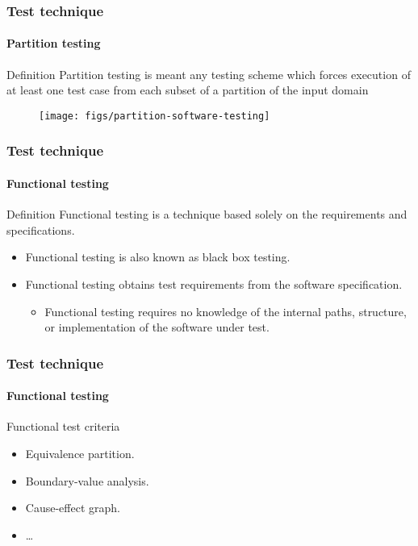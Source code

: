 \begin{frame}
\frametitle{Test technique}
\framesubtitle{Partition testing}
\label{concept:partition-testing}

\begin{block:concept}{Definition}
Partition testing is meant any testing scheme which forces execution
of at least one test case from each subset of a partition of the input
domain
\end{block:concept}

\begin{figure}
    \centering
    \texttt{[image: figs/partition-software-testing]}
\end{figure}
\end{frame}



\begin{frame}
\frametitle{Test technique}
\framesubtitle{Functional testing}
\label{concept:functional-testing}

\begin{block:concept}{Definition}
Functional testing is a technique based solely on the requirements and
specifications.
\end{block:concept}

\begin{block:fact}{}
\begin{itemize}
	\item Functional testing is also known as black box testing.

	\item Functional testing obtains test requirements from the
	software specification.
	\begin{itemize}
		\item Functional testing requires no knowledge of the internal paths,
		structure, or implementation of the software under test.
	\end{itemize}
\end{itemize}
\end{block:fact}

\hfill
{}
\end{frame}


\begin{frame}
\frametitle{Test technique}
\framesubtitle{Functional testing}

\begin{block:fact}{Functional test criteria}
\begin{itemize}
	\item Equivalence partition.
	\item Boundary-value analysis.
	\item Cause-effect graph.
	\item \ldots
\end{itemize}
\end{block:fact}
\end{frame}



